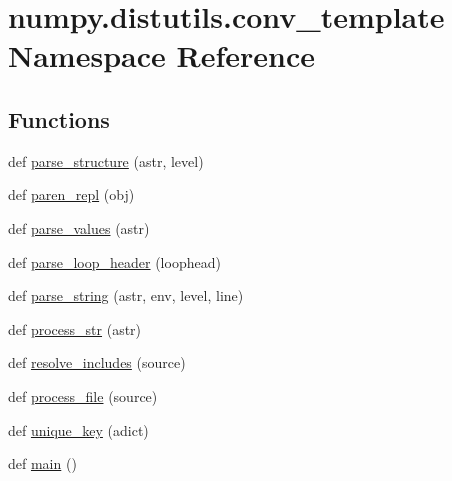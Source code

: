 \hypertarget{namespacenumpy_1_1distutils_1_1conv__template}{}\section{numpy.\+distutils.\+conv\+\_\+template Namespace Reference}
\label{namespacenumpy_1_1distutils_1_1conv__template}
\subsection*{Functions}
\begin{DoxyCompactItemize}
\item 
def \hyperlink{namespacenumpy_1_1distutils_1_1conv__template_adff8a6bf8353337e7163e1f8c8188d9f}{parse\+\_\+structure} (astr, level)
\item 
def \hyperlink{namespacenumpy_1_1distutils_1_1conv__template_a301c77b2779228cd7caca44b6d9cbf62}{paren\+\_\+repl} (obj)
\item 
def \hyperlink{namespacenumpy_1_1distutils_1_1conv__template_a7684c4164f65f4a4220388209fff0dd6}{parse\+\_\+values} (astr)
\item 
def \hyperlink{namespacenumpy_1_1distutils_1_1conv__template_a64ce4a606053a382077b7a377b2d5e99}{parse\+\_\+loop\+\_\+header} (loophead)
\item 
def \hyperlink{namespacenumpy_1_1distutils_1_1conv__template_ad8fbc52c2b4aade3f0017762dec0656b}{parse\+\_\+string} (astr, env, level, line)
\item 
def \hyperlink{namespacenumpy_1_1distutils_1_1conv__template_af0f87c6e2009ca8aa142a1b2af0b1886}{process\+\_\+str} (astr)
\item 
def \hyperlink{namespacenumpy_1_1distutils_1_1conv__template_a1ac7dc9024e2d51010b7855542194f1d}{resolve\+\_\+includes} (source)
\item 
def \hyperlink{namespacenumpy_1_1distutils_1_1conv__template_a7ffe60fa5ab0a64b3fde62c80e7d3587}{process\+\_\+file} (source)
\item 
def \hyperlink{namespacenumpy_1_1distutils_1_1conv__template_a0ee82d7dd7f3428aac656e03d3b0a6c5}{unique\+\_\+key} (adict)
\item 
def \hyperlink{namespacenumpy_1_1distutils_1_1conv__template_a9f53ec3e14975b0b569bace7bfb3fc71}{main} ()
\end{DoxyCompactItemize}
